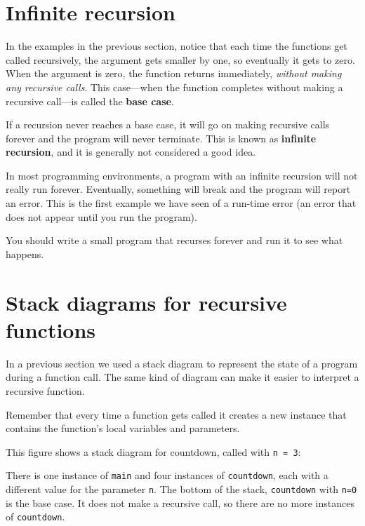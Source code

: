 \section {Infinite recursion}

In the examples in the previous section, notice that each time the
functions get called recursively, the argument gets smaller by one, so
eventually it gets to zero.  When the argument is zero, the function
returns immediately, {\em without making any recursive calls}.
This case---when the function completes without making a recursive
call---is called the {\bf base case}.

If a recursion never reaches a base case, it will go on making recursive
calls forever and the program will never terminate.  This is known as
{\bf infinite recursion}, and it is generally not considered a good
idea.


In most programming environments, a program with an infinite
recursion will not really run forever.  Eventually, something
will break and the program will report an error.  This is the
first example we have seen of a run-time error (an error that
does not appear until you run the program).

You should write a small program that recurses forever and run
it to see what happens.

\section {Stack diagrams for recursive functions}

In a previous section we used a stack diagram to represent the
state of a program during a function call.  The same kind
of diagram can make it easier to interpret a recursive function.

Remember that every time a function gets called it creates
a new instance that contains
the function's local variables and parameters.

This figure shows a stack diagram for countdown, called
with {\tt n = 3}:

\vspace{0.1in}
\centerline{}
\vspace{0.1in}
%
There is one instance of {\tt main} and four instances of
{\tt countdown}, each with a different value for the parameter
{\tt n}.  The bottom of the stack, {\tt countdown} with {\tt n=0}
is the base case.  It does not make a recursive call, so there
are no more instances of {\tt countdown}.

